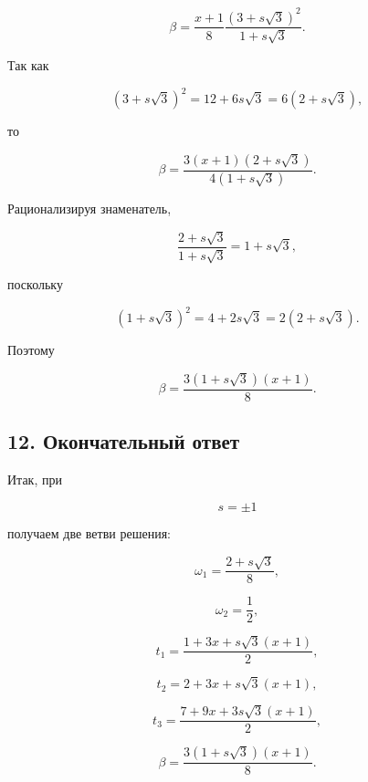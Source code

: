 \documentclass[a4paper,12pt]{article}
\begin{document}
	\[
	\beta
	=
	\frac{x+1}{8}
	\frac{(3+s\sqrt3)^2}{1+s\sqrt3}.
	\]
	
	Так как
	
	\[
	(3+s\sqrt3)^2
	=
	12+6s\sqrt3
	=
	6(2+s\sqrt3),
	\]
	
	то
	
	\[
	\beta
	=
	\frac{3(x+1)(2+s\sqrt3)}
	{4(1+s\sqrt3)}.
	\]
	
	Рационализируя знаменатель,
	
	\[
	\frac{2+s\sqrt3}{1+s\sqrt3}
	=
	1+s\sqrt3,
	\]
	
	поскольку
	
	\[
	(1+s\sqrt3)^2
	=
	4+2s\sqrt3
	=
	2(2+s\sqrt3).
	\]
	
	Поэтому
	
	\begin{equation}
		\boxed{
			\beta
			=
			\frac{3(1+s\sqrt3)(x+1)}{8}.
		}
		\label{eq:beta_final_s}
	\end{equation}
	
	\subsection*{12. Окончательный ответ}
	
	Итак, при
	
	\[
	s=\pm1
	\]
	
	получаем две ветви решения:
	
	\begin{equation}
		\boxed{
			\omega_1
			=
			\frac{2+s\sqrt3}{8},
		}
	\end{equation}
	
	\begin{equation}
		\boxed{
			\omega_2
			=
			\frac12,
		}
	\end{equation}
	
	\begin{equation}
		\boxed{
			t_1
			=
			\frac{1+3x+s\sqrt3(x+1)}{2},
		}
	\end{equation}
	
	\begin{equation}
		\boxed{
			t_2
			=
			2+3x+s\sqrt3(x+1),
		}
	\end{equation}
	
	\begin{equation}
		\boxed{
			t_3
			=
			\frac{7+9x+3s\sqrt3(x+1)}{2},
		}
	\end{equation}
	
	\begin{equation}
		\boxed{
			\beta
			=
			\frac{3(1+s\sqrt3)(x+1)}{8}.
		}
	\end{equation}
	
\end{document}

